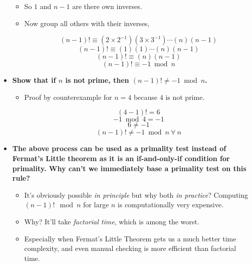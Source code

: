 \documentclass[11pt]{article}
\begin{document}
\begin{itemize}
\begin{itemize}
\item So $1$ and $n - 1$ are there own inverses.

\item Now group all others with their inverses,

$$ (n - 1)! \equiv (2 \times 2^{-1})(3 \times 3^{-1}) \cdots (n)(n - 1) $$
$$ (n - 1)! \equiv (1)(1) \cdots (n)(n - 1) $$
$$ (n - 1)! \equiv (n)(n - 1) $$
$$ (n - 1)! \equiv -1 \bmod n $$

\end{itemize}
  

\item \textbf{Show that if $n$ is not prime, then $(n-1)! \neq -1 \bmod
  n$.}

\begin{itemize}

\item Proof by counterexample for $n = 4$ because $4$ is not prime.

$$ (4 - 1)! = 6 $$
$$ -1 \bmod 4 = -1 $$
$$ 6 \ne -1 $$
$$ (n-1)! \ne -1 \bmod n \: \forall \:  n $$

\end{itemize}

\item \textbf{The above process can be used as a primality test instead of
  Fermat's Little theorem as it is an if-and-only-if condition for
  primality. Why can't we immediately base a primality test on this
  rule?}
  
\begin{itemize}

\item It's obviously possible \emph{in principle} but why both \emph{in practice}? Computing $(n - 1)! \mod n$ for large $n$ is computationally very expensive.

\item Why? It'll take \emph{factorial time}, which is among the worst.

\item Especially when Fermat's Little Theorem gets us a much better time 
complexity, and even manual checking is more efficient than factorial time.

\end{itemize}  

\end{itemize}
\end{document}
